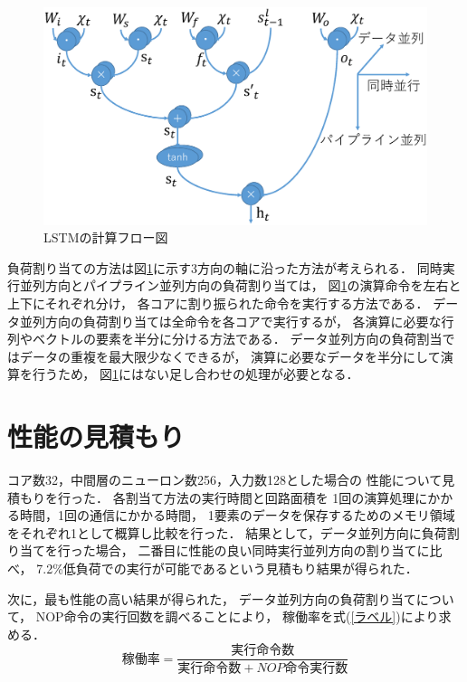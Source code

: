 \documentclass[a4j]{jarticle}
\begin{document}
\begin{Abstract}
 \begin{figure}[h]
  \centering
  \includegraphics[scale=0.25]{flow.eps}
  \caption{LSTMの計算フロー図}
  \label{フロー図}
 \end{figure}
負荷割り当ての方法は図\ref{フロー図}に示す3方向の軸に沿った方法が考えられる．
同時実行並列方向とパイプライン並列方向の負荷割り当ては，
図\ref{フロー図}の演算命令を左右と上下にそれぞれ分け，
各コアに割り振られた命令を実行する方法である．
データ並列方向の負荷割り当ては全命令を各コアで実行するが，
各演算に必要な行列やベクトルの要素を半分に分ける方法である．
データ並列方向の負荷割当ではデータの重複を最大限少なくできるが，
演算に必要なデータを半分にして演算を行うため，
図\ref{フロー図}にはない足し合わせの処理が必要となる．


 \section{性能の見積もり}
 コア数32，中間層のニューロン数256，入力数128とした場合の
 性能について見積もりを行った．
 各割当て方法の実行時間と回路面積を
 1回の演算処理にかかる時間，1回の通信にかかる時間，
 1要素のデータを保存するためのメモリ領域をそれぞれ1として概算し比較を行った．
 結果として，データ並列方向に負荷割り当てを行った場合，
 二番目に性能の良い同時実行並列方向の割り当てに比べ，
 7.2\%低負荷での実行が可能であるという見積もり結果が得られた．

次に，最も性能の高い結果が得られた，
データ並列方向の負荷割り当てについて，
NOP命令の実行回数を調べることにより，
稼働率を式(\ref{ラベル})により求める．
\begin{equation}
  稼働率 = \frac{実行命令数}{実行命令数+NOP命令実行数}
  \label{ラベル}
\end{equation}


\end{Abstract}
\end{document}
